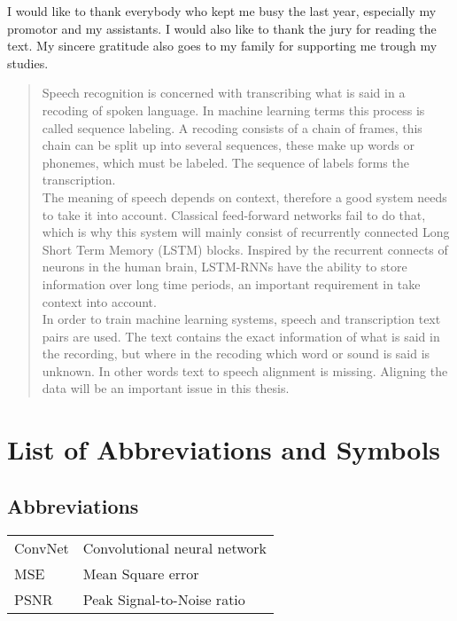 \documentclass[master=ewit,english]{kulemt}
\begin{document}
\begin{preface}
  I would like to thank everybody who kept me busy the last year,
  especially my promotor and my assistants. I would also like to thank the
  jury for reading the text. My sincere gratitude also goes to my family
  for supporting me trough my studies.
\end{preface}

\tableofcontents*

\begin{abstract}
  Speech recognition is concerned with transcribing what is said in a
  recoding of spoken language. In machine learning terms this process is
  called sequence labeling. A recoding consists of a chain of frames,
  this chain can be split up into several sequences, these make
  up words or phonemes, which must be labeled. The sequence of labels forms
  the transcription. \\
  The meaning of speech depends on context, therefore a good system needs to
  take it into account. Classical feed-forward networks fail to do that, which
  is why this system will mainly consist of recurrently connected Long Short Term
  Memory (LSTM) blocks. Inspired by the recurrent connects of neurons in the human
  brain, LSTM-RNNs have the ability to store information over long time periods,
  an important requirement in take context into account. \\
  In order to train machine learning systems, speech and transcription text
  pairs are used. The text contains the exact information of what is said in
  the recording, but where in the recoding which word or sound is said is unknown.
  In other words text to speech alignment is missing. Aligning the data will be an
  important issue in this thesis.

\end{abstract}

\listoffiguresandtables
\chapter{List of Abbreviations and Symbols}
\section*{Abbreviations}
\begin{flushleft}
  \renewcommand{\arraystretch}{1.1}
  \begin{tabularx}{\textwidth}{@{}p{12mm}X@{}}
    ConvNet   & Convolutional neural network \\
    MSE   & Mean Square error \\
    PSNR  & Peak Signal-to-Noise ratio \\
  \end{tabularx}
\end{flushleft}
\end{document}
